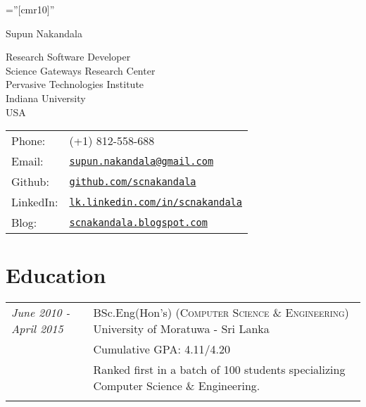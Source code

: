 \documentclass[a4paper,10pt]{article}
\begin{document}
\pagestyle{empty} %

\font\fb=''[cmr10]'' %

\par{\centering
		{\Huge Supun Nakandala}
		\bigskip
\par}


\begin{minipage}{0.58\linewidth}
  Research Software Developer\\
  Science Gateways Research Center\\
  Pervasive Technologies Institute\\
  Indiana University\\
  USA\\
\end{minipage}
\begin{minipage}{0.45\linewidth}
  \begin{tabular}{ll}
    Phone: & (+1) 812-558-688 \\
    Email: & \href{mailto:supun.nakandala@gmail.com}{\tt supun.nakandala@gmail.com} \\
    Github: & \href{http://github.com/scnakandala}{\tt github.com/scnakandala}\\
    LinkedIn: & \href{http://lk.linkedin.com/in/scnakandala}{\tt lk.linkedin.com/in/scnakandala}\\
    Blog: & \href{http://scnakandala.blogspot.com}{\tt scnakandala.blogspot.com}\\
  \end{tabular}
\end{minipage}

\section{Education}
\begin{tabular}{p{3cm}|p{13.5cm}}

\emph{June 2010 - April 2015} & BSc.Eng(Hon's) (\textsc{Computer Science \& Engineering}) University of Moratuwa - Sri Lanka\\
&\normalsize Cumulative GPA: 4.11/4.20\\
&\normalsize Ranked first in a batch of 100 students specializing Computer Science \& Engineering.\\&\\

\end{tabular}
\end{document}
